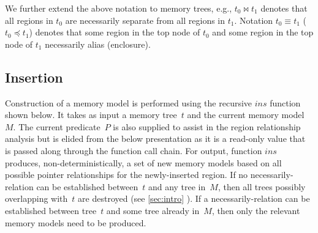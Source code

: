 We further extend the above notation to memory trees,
e.g., $t_0 \bowtie t_1$ denotes that all regions in $t_0$ are necessarily separate from all regions in $t_1$.
Notation $t_0 \equiv t_1$ ($t_0 \preceq t_1$) denotes that some region in the top node of $t_0$  and some region in the top node of $t_1$ necessarily alias (enclosure).

\subsection{Insertion}
Construction of a memory model is performed
using the recursive $\mathit{ins}$ function shown below.
It takes as input a memory tree~$t$ and the current memory model~$M$.
The current predicate~$P$ is also supplied
to assist in the region relationship analysis
but is elided from the below presentation as it is a read-only value
that is passed along through the function call chain.
For output, function $\mathit{ins}$ produces, non-deterministically,
a set of new memory models based on all possible pointer relationships
for the newly-inserted region.
If no necessarily-relation can be established between~$t$ and any tree in~$M$, then all trees possibly overlapping with~$t$ are destroyed (see \cref{sec:intro} ).
If a necessarily-relation can be established between tree~$t$ and some tree already in~$M$, then only the relevant memory models need to be produced.


